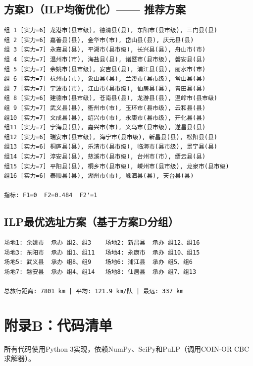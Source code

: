 \documentclass[12pt,a4paper]{article}
\begin{document}
\subsection*{方案D（ILP均衡优化）—— 推荐方案}

{\small
\begin{verbatim}
组 1 [实力=6] 龙港市(县市级), 德清县(县), 东阳市(县市级), 三门县(县)
组 2 [实力=6] 嘉善县(县), 金华市(市), 岱山县(县), 庆元县(县)
组 3 [实力=7] 永嘉县(县), 平湖市(县市级), 长兴县(县), 舟山市(市)
组 4 [实力=7] 温州市(市), 海盐县(县), 诸暨市(县市级), 磐安县(县)
组 5 [实力=7] 余姚市(县市级), 安吉县(县), 浦江县(县), 丽水市(市)
组 6 [实力=7] 杭州市(市), 象山县(县), 兰溪市(县市级), 常山县(县)
组 7 [实力=7] 宁波市(市), 江山市(县市级), 仙居县(县), 青田县(县)
组 8 [实力=6] 建德市(县市级), 苍南县(县), 龙游县(县), 温岭市(县市级)
组 9 [实力=7] 武义县(县), 衢州市(市), 玉环市(县市级), 云和县(县)
组10 [实力=7] 文成县(县), 绍兴市(市), 永康市(县市级), 开化县(县)
组11 [实力=7] 宁海县(县), 嘉兴市(市), 义乌市(县市级), 遂昌县(县)
组12 [实力=6] 瑞安市(县市级), 海宁市(县市级), 新昌县(县), 松阳县(县)
组13 [实力=6] 桐庐县(县), 乐清市(县市级), 临海市(县市级), 景宁县(县)
组14 [实力=7] 淳安县(县), 慈溪市(县市级), 台州市(市), 缙云县(县)
组15 [实力=7] 平阳县(县), 桐乡市(县市级), 嵊州市(县市级), 龙泉市(县市级)
组16 [实力=6] 泰顺县(县), 湖州市(市), 嵊泗县(县), 天台县(县)

指标: F1=0  F2=0.484  F2'=1
\end{verbatim}
}

\subsection*{ILP最优选址方案（基于方案D分组）}

{\small
\begin{verbatim}
场地1: 余姚市  承办 组2、组3    场地2: 新昌县  承办 组12、组16
场地3: 东阳市  承办 组1、组11   场地4: 永康市  承办 组10、组15
场地5: 武义县  承办 组8、组9    场地6: 浦江县  承办 组5、组6
场地7: 磐安县  承办 组4、组14   场地8: 仙居县  承办 组7、组13

总旅行距离: 7801 km | 平均: 121.9 km/队 | 最远: 337 km
\end{verbatim}
}

\section*{附录B：代码清单}
\label{app:code}

所有代码使用Python 3实现，依赖NumPy、SciPy和PuLP（调用COIN-OR CBC求解器）。
\end{document}
